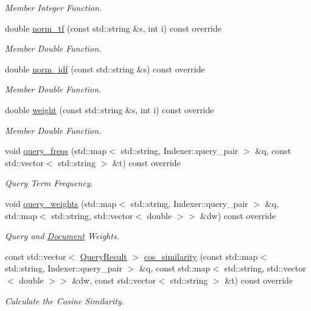 \begin{DoxyCompactItemize}
\begin{DoxyCompactList}\small\item\em Member Integer Function. \end{DoxyCompactList}\item 
double \hyperlink{class_movie_indexer_a1ea55cde00e7a8be06eedcff56021de2}{norm\+\_\+tf} (const std\+::string \&s, int i) const override
\begin{DoxyCompactList}\small\item\em Member Double Function. \end{DoxyCompactList}\item 
double \hyperlink{class_movie_indexer_a488c038d7aa0b60d5e8192c12f19c33e}{norm\+\_\+idf} (const std\+::string \&s) const override
\begin{DoxyCompactList}\small\item\em Member Double Function. \end{DoxyCompactList}\item 
double \hyperlink{class_movie_indexer_a3caddb617dd3324b6535a22aff8ea987}{weight} (const std\+::string \&s, int i) const override
\begin{DoxyCompactList}\small\item\em Member Double Function. \end{DoxyCompactList}\item 
void \hyperlink{class_movie_indexer_a982d10037e8307649ee62eda078ae531}{query\+\_\+freqs} (std\+::map$<$ std\+::string, Indexer\+::query\+\_\+pair $>$ \&q, const std\+::vector$<$ std\+::string $>$ \&t) const override
\begin{DoxyCompactList}\small\item\em Query Term Frequency. \end{DoxyCompactList}\item 
void \hyperlink{class_movie_indexer_a7a01d72125aa96e5d286a2bd0cb13ab8}{query\+\_\+weights} (std\+::map$<$ std\+::string, Indexer\+::query\+\_\+pair $>$ \&q, std\+::map$<$ std\+::string, std\+::vector$<$ double $>$$>$ \&dw) const override
\begin{DoxyCompactList}\small\item\em Query and \hyperlink{class_document}{Document} Weights. \end{DoxyCompactList}\item 
const std\+::vector$<$ \hyperlink{class_query_result}{Query\+Result} $>$ \hyperlink{class_movie_indexer_a2e09c1755d3d5b0fa6f238352d1850a7}{cos\+\_\+similarity} (const std\+::map$<$ std\+::string, Indexer\+::query\+\_\+pair $>$ \&q, const std\+::map$<$ std\+::string, std\+::vector$<$ double $>$$>$ \&dw, const std\+::vector$<$ std\+::string $>$ \&t) const override
\begin{DoxyCompactList}\small\item\em Calculate the Cosine Similarity. \end{DoxyCompactList}\end{DoxyCompactItemize}

